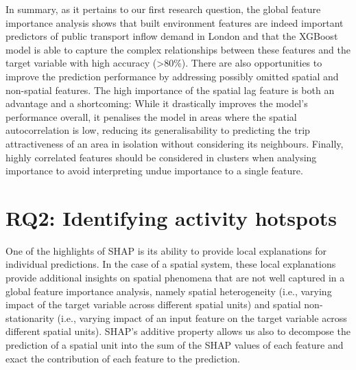 In summary, as it pertains to our first research question, the global feature importance analysis shows that built environment features are indeed important predictors of public transport inflow demand in London and that the XGBoost model is able to capture the complex relationships between these features and the target variable with high accuracy (>80\%). There are also opportunities to improve the prediction performance by addressing possibly omitted spatial and non-spatial features. The high importance of the spatial lag feature is both an advantage and a shortcoming: While it drastically improves the model's performance overall, it penalises the model in areas where the spatial autocorrelation is low, reducing its generalisability to predicting the trip attractiveness of an area in isolation without considering its neighbours. Finally, highly correlated features should be considered in clusters when analysing importance to avoid interpreting undue importance to a single feature.

\pagebreak[4]
\section*{RQ2: Identifying activity hotspots}

One of the highlights of SHAP is its ability to provide local explanations for individual predictions. In the case of a spatial system, these local explanations provide additional insights on spatial phenomena that are not well captured in a global feature importance analysis, namely spatial heterogeneity (i.e., varying impact of the target variable across different spatial units) and spatial non-stationarity (i.e., varying impact of an input feature on the target variable across different spatial units). SHAP's additive property allows us also to decompose the prediction of a spatial unit into the sum of the SHAP values of each feature and exact the contribution of each feature to the prediction.

